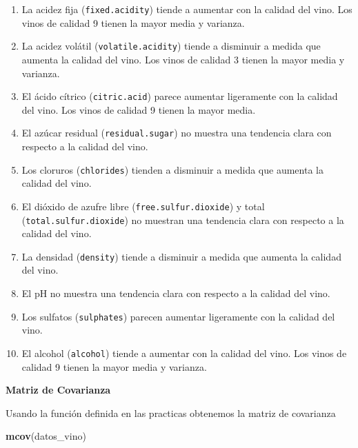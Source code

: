 \documentclass[
]{article}
\newenvironment{Shaded}{\begin{snugshade}}{\end{snugshade}}
\newcommand{\FunctionTok}[1]{\textcolor[rgb]{0.13,0.29,0.53}{\textbf{#1}}}
\newcommand{\NormalTok}[1]{#1}
\begin{document}
\begin{enumerate}
\def\labelenumi{\arabic{enumi}.}
\item
  La acidez fija (\texttt{fixed.acidity}) tiende a aumentar con la
  calidad del vino. Los vinos de calidad 9 tienen la mayor media y
  varianza.
\item
  La acidez volátil (\texttt{volatile.acidity}) tiende a disminuir a
  medida que aumenta la calidad del vino. Los vinos de calidad 3 tienen
  la mayor media y varianza.
\item
  El ácido cítrico (\texttt{citric.acid}) parece aumentar ligeramente
  con la calidad del vino. Los vinos de calidad 9 tienen la mayor media.
\item
  El azúcar residual (\texttt{residual.sugar}) no muestra una tendencia
  clara con respecto a la calidad del vino.
\item
  Los cloruros (\texttt{chlorides}) tienden a disminuir a medida que
  aumenta la calidad del vino.
\item
  El dióxido de azufre libre (\texttt{free.sulfur.dioxide}) y total
  (\texttt{total.sulfur.dioxide}) no muestran una tendencia clara con
  respecto a la calidad del vino.
\item
  La densidad (\texttt{density}) tiende a disminuir a medida que aumenta
  la calidad del vino.
\item
  El pH no muestra una tendencia clara con respecto a la calidad del
  vino.
\item
  Los sulfatos (\texttt{sulphates}) parecen aumentar ligeramente con la
  calidad del vino.
\item
  El alcohol (\texttt{alcohol}) tiende a aumentar con la calidad del
  vino. Los vinos de calidad 9 tienen la mayor media y varianza.
\end{enumerate}

\textbf{Matriz de Covarianza}

Usando la función definida en las practicas obtenemos la matriz de
covarianza

\begin{Shaded}
\begin{Highlighting}[]
\FunctionTok{mcov}\NormalTok{(datos\_vino)}
\end{Highlighting}
\end{Shaded}
\end{document}

